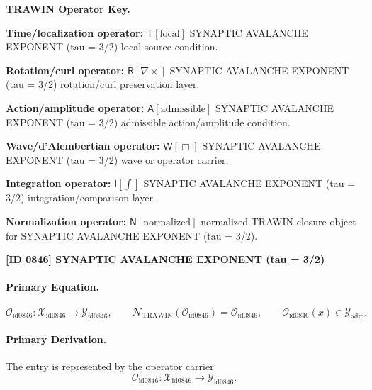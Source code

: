 \par\vspace{0.45\baselineskip}
\noindent\begin{minipage}[t]{\linewidth}
\begingroup
\small
\raggedright
\textbf{TRAWIN Operator Key.}\par
\noindent\textbf{Time/localization operator:} $\mathsf{T}\!\left[\mathrm{local}\right]$ SYNAPTIC AVALANCHE EXPONENT (tau = 3/2) local source condition.\par
\noindent\textbf{Rotation/curl operator:} $\mathsf{R}\!\left[\nabla\times\right]$ SYNAPTIC AVALANCHE EXPONENT (tau = 3/2) rotation/curl preservation layer.\par
\noindent\textbf{Action/amplitude operator:} $\mathsf{A}\!\left[\mathrm{admissible}\right]$ SYNAPTIC AVALANCHE EXPONENT (tau = 3/2) admissible action/amplitude condition.\par
\noindent\textbf{Wave/d'Alembertian operator:} $\mathsf{W}\!\left[\Box\right]$ SYNAPTIC AVALANCHE EXPONENT (tau = 3/2) wave or operator carrier.\par
\noindent\textbf{Integration operator:} $\mathsf{I}\!\left[\int\right]$ SYNAPTIC AVALANCHE EXPONENT (tau = 3/2) integration/comparison layer.\par
\noindent\textbf{Normalization operator:} $\mathsf{N}\!\left[\mathrm{normalized}\right]$ normalized TRAWIN closure object for SYNAPTIC AVALANCHE EXPONENT (tau = 3/2).\par
\endgroup
\end{minipage}

\clearpage
\noindent\textbf{[ID 0846] SYNAPTIC AVALANCHE EXPONENT (tau = 3/2)}\par
\vspace{0.35em}
\paragraph{Primary Equation.}
\[
\mathcal{O}_{\mathrm{id0846}}:\mathcal{X}_{\mathrm{id0846}}\longrightarrow \mathcal{Y}_{\mathrm{id0846}},\qquad
\mathcal{N}_{\mathrm{TRAWIN}}(\mathcal{O}_{\mathrm{id0846}})=\mathcal{O}_{\mathrm{id0846}},\qquad
\mathcal{O}_{\mathrm{id0846}}(x)\in\mathcal{Y}_{\mathrm{adm}}.
\]

\paragraph{Primary Derivation.} The entry is represented by the operator carrier\[
\mathcal{O}_{\mathrm{id0846}}:\mathcal{X}_{\mathrm{id0846}}\longrightarrow \mathcal{Y}_{\mathrm{id0846}}.
\]

